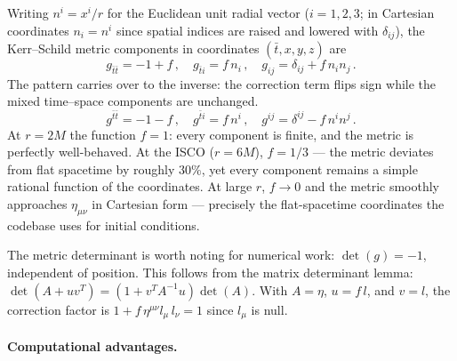 Writing $n^i = x^i/r$ for the Euclidean unit radial vector ($i = 1, 2, 3$;
in Cartesian coordinates $n_i = n^i$ since spatial indices are raised and
lowered with $\delta_{ij}$), the Kerr--Schild metric components in
coordinates $(\bar{t}, x, y, z)$ are
%
\begin{equation}
  g_{\bar{t}\bar{t}} = -1 + f \,, \quad
  g_{\bar{t}i} = f\,n_i \,, \quad
  g_{ij} = \delta_{ij} + f\,n_i n_j \,.
  \label{eq:ks-components}
\end{equation}
%
The pattern carries over to the inverse: the correction term flips sign
while the mixed time--space components are unchanged.
%
\begin{equation}
  g^{\bar{t}\bar{t}} = -1 - f \,, \quad
  g^{\bar{t}i} = f\,n^i \,, \quad
  g^{ij} = \delta^{ij} - f\,n^i n^j \,.
  \label{eq:ks-inv-components}
\end{equation}
%
At $r = 2M$ the function $f = 1$: every component is finite, and the
metric is perfectly well-behaved.  At the ISCO ($r = 6M$), $f = 1/3$ ---
the metric deviates from flat spacetime by roughly $30\%$, yet every
component remains a simple rational function of the coordinates.  At large
$r$, $f \to 0$ and the metric smoothly approaches $\eta_{\mu\nu}$ in
Cartesian form --- precisely the flat-spacetime coordinates the codebase
uses for initial conditions.

The metric determinant is worth noting for numerical work: $\det(g) = -1$,
independent of position.  This follows from the matrix determinant lemma:
$\det(A + uv^T) = (1 + v^T\!A^{-1}u)\det(A)$.  With $A = \eta$,
$u = f\,l$, and $v = l$, the correction factor is
$1 + f\,\eta^{\mu\nu}l_\mu\,l_\nu = 1$ since $l_\mu$ is null.

\paragraph{Computational advantages.}


